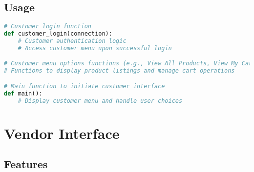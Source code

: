 \documentclass[12pt]{article}
\begin{document}
\subsection{Usage}
\begin{lstlisting}[language=Python]
# Customer login function
def customer_login(connection):
    # Customer authentication logic
    # Access customer menu upon successful login

# Customer menu options functions (e.g., View All Products, View My Cart)
# Functions to display product listings and manage cart operations

# Main function to initiate customer interface
def main():
    # Display customer menu and handle user choices
\end{lstlisting}

\section{Vendor Interface}

\subsection{Features}
\end{document}

